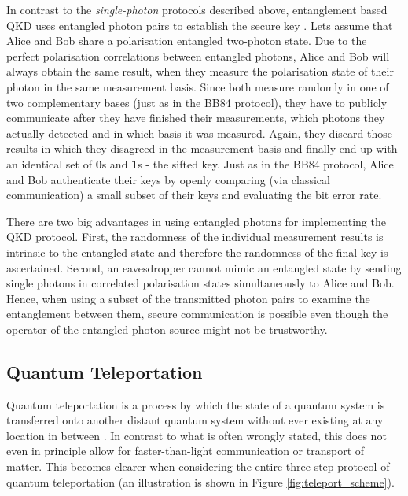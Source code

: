 \documentclass{article}
\begin{document}
In contrast to the \textit{single-photon} protocols described above, entanglement based QKD uses entangled photon pairs to establish the secure key \cite{Ekert:1991kl,Bennett:1992cg}.  
Lets assume that Alice and Bob share a polarisation entangled two-photon state. Due to the perfect polarisation correlations between entangled photons, Alice and Bob will always obtain the same result, when they measure the polarisation state of their photon in the same measurement basis. Since both measure randomly in one of two complementary bases (just as in the BB84 protocol), they have to publicly communicate after they have finished their measurements, which photons they actually detected and in which basis it was measured. Again, they discard those results in which they disagreed in the measurement basis and finally end up with an identical set of \textbf{0}s and \textbf{1}s - the sifted key. Just as in the BB84 protocol, Alice and Bob authenticate their keys by openly comparing (via classical communication) a small subset of their keys and evaluating the bit error rate.

There are two big advantages in using entangled photons for implementing the QKD protocol. First, the randomness of the individual measurement results is intrinsic to the entangled state and therefore the randomness of the final key is ascertained. Second, an eavesdropper cannot mimic an entangled state by sending single photons in correlated polarisation states simultaneously to Alice and Bob. Hence, when using a subset of the transmitted photon pairs to examine the entanglement between them, secure communication is possible even though the operator of the entangled photon source might not be trustworthy.

\subsection{Quantum Teleportation}
Quantum teleportation is a process by which the state of a quantum system is transferred onto another distant quantum system without ever existing at any location in between \cite{Bennett:1993jc}. In contrast to what is often wrongly stated, this does not even in principle allow for faster-than-light communication or transport of matter. This becomes clearer when considering the entire three-step protocol of quantum teleportation (an illustration is shown in Figure \ref{fig:teleport_scheme}).
\end{document}
